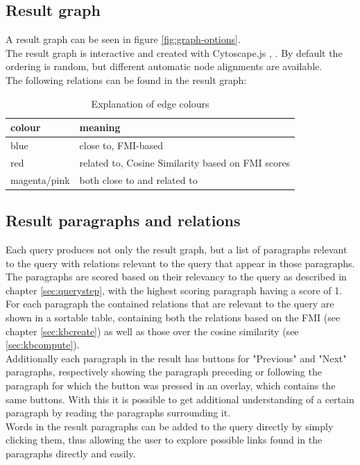 \subsection{Result graph}
\label{sec:resultgraph}
A result graph can be seen in figure \ref{fig:graph-options}.\\
The result graph is interactive and created with Cytoscape.js \cite{doi:10.1093/bioinformatics/btv557}, \cite{Cytoscapejs}. By default the ordering is random, but different automatic node alignments are available.\\
The following relations can be found in the result graph:
\begin{table}[H]
\centering
    \begin{tabular}{|l|l|}
    \hline
    colour & meaning\\
    \hline
    blue & close to, FMI-based \\
    red &related to, Cosine Similarity based on FMI scores \\
    magenta/pink & both close to and related to\\
    \hline
\end{tabular}
\caption{Explanation of edge colours}
\label{tab:relation_meaning}
\end{table}

\subsection{Result paragraphs and relations}
Each query produces not only the result graph, but a list of paragraphs relevant to the query with relations relevant to the query that appear in those paragraphs.\\
The paragraphs are scored based on their relevancy to the query as described in chapter \ref{sec:querystep}, with the highest scoring paragraph having a score of 1. For each paragraph the contained relations that are relevant to the query are shown in a sortable table, containing both the relations based on the FMI (see chapter \ref{sec:kbcreate}) as well as those over the cosine similarity (see \ref{sec:kbcompute}).\\
Additionally each paragraph in the result has buttons for "Previous" and "Next" paragraphs, respectively showing the paragraph preceding or following the paragraph for which the button was pressed in an overlay, which contains the same buttons. With this it is possible to get additional understanding of a certain paragraph by reading the paragraphs surrounding it.\\
Words in the result paragraphs can be added to the query directly by simply clicking them, thus allowing the user to explore possible links found in the paragraphs directly and easily.



